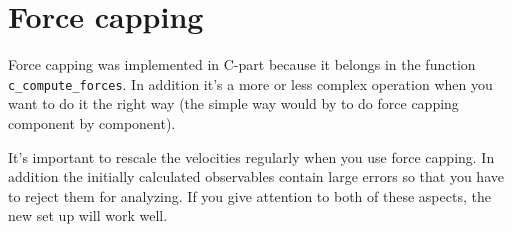 \documentclass[12pt,a4paper]{scrartcl}
\begin{document}
\section{Force capping}
Force capping was implemented in C-part because it belongs in the function \verb+c_compute_forces+. In addition it's a more or less complex operation when you want to do it the right way (the simple way would by to do force capping component by component).

It's important to rescale the velocities regularly when you use force capping. In addition the initially calculated observables contain large errors so that you have to reject them for analyzing. If you give attention to both of these aspects, the new set up will work well.
\end{document}
